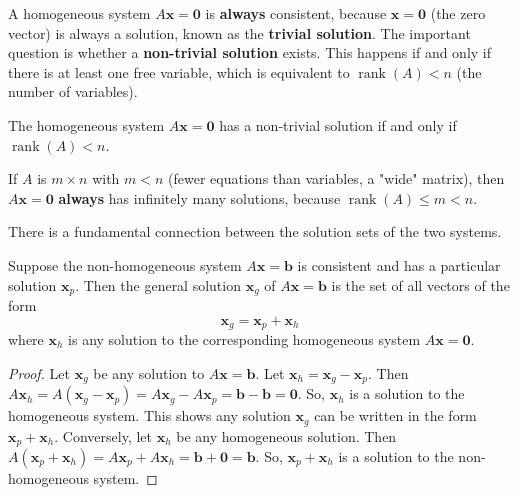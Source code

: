 \documentclass[oneside]{book}
\begin{document}
A homogeneous system $A\mathbf{x} = \mathbf{0}$ is \textbf{always} consistent, because $\mathbf{x} = \mathbf{0}$ (the zero vector) is always a solution, known as the \textbf{trivial solution}.
The important question is whether a \textbf{non-trivial solution} exists.
This happens if and only if there is at least one free variable, which is equivalent to $\operatorname{rank}(A) < n$ (the number of variables).

\begin{theorem}
The homogeneous system $A\mathbf{x} = \mathbf{0}$ has a non-trivial solution if and only if $\operatorname{rank}(A) < n$.
\end{theorem}
\begin{corollary}
If $A$ is $m \times n$ with $m < n$ (fewer equations than variables, a "wide" matrix), then $A\mathbf{x} = \mathbf{0}$ \textbf{always} has infinitely many solutions, because $\operatorname{rank}(A) \le m < n$.
\end{corollary}

There is a fundamental connection between the solution sets of the two systems.

\begin{theorem}
Suppose the non-homogeneous system $A\mathbf{x} = \mathbf{b}$ is consistent and has a particular solution $\mathbf{x}_p$. Then the general solution $\mathbf{x}_g$ of $A\mathbf{x} = \mathbf{b}$ is the set of all vectors of the form
\[ \mathbf{x}_g = \mathbf{x}_p + \mathbf{x}_h \]
where $\mathbf{x}_h$ is any solution to the corresponding homogeneous system $A\mathbf{x} = \mathbf{0}$.
\end{theorem}
\begin{proof}
Let $\mathbf{x}_g$ be any solution to $A\mathbf{x} = \mathbf{b}$. Let $\mathbf{x}_h = \mathbf{x}_g - \mathbf{x}_p$.
Then $A\mathbf{x}_h = A(\mathbf{x}_g - \mathbf{x}_p) = A\mathbf{x}_g - A\mathbf{x}_p = \mathbf{b} - \mathbf{b} = \mathbf{0}$.
So, $\mathbf{x}_h$ is a solution to the homogeneous system.
This shows any solution $\mathbf{x}_g$ can be written in the form $\mathbf{x}_p + \mathbf{x}_h$.
Conversely, let $\mathbf{x}_h$ be any homogeneous solution.
Then $A(\mathbf{x}_p + \mathbf{x}_h) = A\mathbf{x}_p + A\mathbf{x}_h = \mathbf{b} + \mathbf{0} = \mathbf{b}$.
So, $\mathbf{x}_p + \mathbf{x}_h$ is a solution to the non-homogeneous system.
\end{proof}
\end{document}
